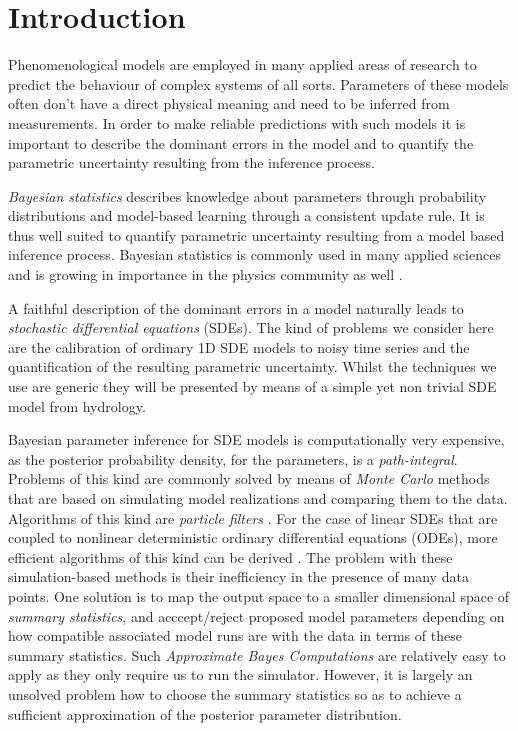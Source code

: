 \documentclass[12pt,a4paper,final]{iopart}
\begin{document}
\section{Introduction}

Phenomenological models are employed in many applied areas of research to predict the behaviour of complex systems of all sorts.
Parameters of these models often don't have a direct physical meaning and need to be inferred from measurements.
In order to make reliable predictions with such models it is important to describe the dominant errors in the model and to quantify the parametric uncertainty resulting from the inference process.

{\em Bayesian statistics} describes knowledge about parameters through probability distributions and model-based learning through a consistent update rule. It is thus well suited to quantify parametric uncertainty resulting from a model based inference process.
Bayesian statistics is commonly used in many applied sciences and is growing in importance in the physics community as well \cite{vonToussaint_2011}.

A faithful description of the dominant errors in a model naturally leads to {\em stochastic differential equations} (SDEs).
The kind of problems we consider here are the calibration of ordinary 1D SDE models to noisy time series and the quantification of the resulting parametric uncertainty.
Whilst the techniques we use are generic they will be presented by means of a simple yet non trivial SDE model from hydrology.

Bayesian parameter inference for SDE models is computationally very expensive, as the posterior probability density, for the parameters, is a {\em path-integral}.
Problems of this kind are commonly solved by means of {\em Monte Carlo} methods that are based on simulating model realizations and comparing them to the data. Algorithms of this kind are {\em particle filters} \cite{chopin_2013_SMC2}. For the case of linear SDEs that are coupled to nonlinear deterministic ordinary differential equations (ODEs), more efficient algorithms of this kind can be derived \cite{tomassini_2009_smoothing, reichert_2009_timedepParameters}.
The problem with these simulation-based methods is their inefficiency in the presence of many data points.
One solution is to map the output space to a smaller dimensional space of {\em summary statistics}, and acccept/reject proposed model parameters depending on how compatible associated model runs are with the data in terms of these summary statistics.
Such {\em Approximate Bayes Computations} \cite{marin_2012_ABC, Albert_2014_ABC} are relatively easy to apply as they only require us to run the simulator. However, it is largely an unsolved problem how to choose the summary statistics so as to achieve a sufficient approximation of the posterior parameter distribution.
\end{document}
